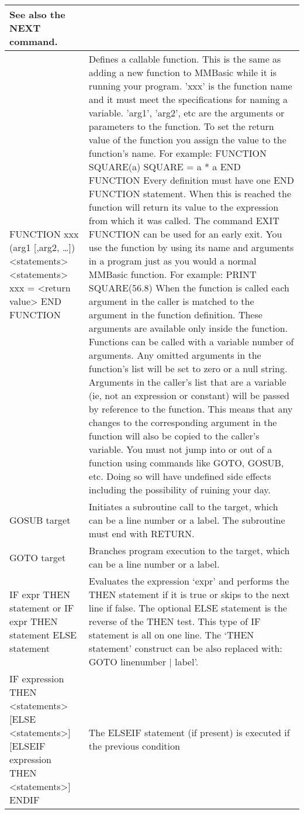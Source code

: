 \documentclass[11pt,fleqn]{book} %
\numberwithin{equation}{section} %
\numberwithin{figure}{section} %
\numberwithin{table}{section} %
\begin{document}
\begin{table}[]
\begin{tabular}{|p{4cm}|p{10cm}|}
See also the NEXT command.
\\ \hline
FUNCTION xxx (arg1
[,arg2, …])
<statements>
<statements>
xxx = <return value>
END FUNCTION
& Defines a callable function. This is the same as adding a new function to
MMBasic while it is running your program.
'xxx' is the function name and it must meet the specifications for naming
a variable. 'arg1', 'arg2', etc are the arguments or parameters to the
function.
To set the return value of the function you assign the value to the
function's name. For example:
FUNCTION SQUARE(a)
SQUARE = a * a
END FUNCTION
Every definition must have one END FUNCTION statement. When this
is reached the function will return its value to the expression from which
it was called. The command EXIT FUNCTION can be used for an early
exit.
You use the function by using its name and arguments in a program just
as you would a normal MMBasic function. For example:
PRINT SQUARE(56.8)
When the function is called each argument in the caller is matched to the
argument in the function definition. These arguments are available only
inside the function.
Functions can be called with a variable number of arguments. Any
omitted arguments in the function's list will be set to zero or a null string.
Arguments in the caller's list that are a variable (ie, not an expression or
constant) will be passed by reference to the function. This means that
any changes to the corresponding argument in the function will also be
copied to the caller's variable.
You must not jump into or out of a function using commands like
GOTO, GOSUB, etc. Doing so will have undefined side effects
including the possibility of ruining your day.
\\ \hline
GOSUB target & Initiates a subroutine call to the target, which can be a line number or a
label. The subroutine must end with RETURN.
\\ \hline
GOTO target & Branches program execution to the target, which can be a line number or
a label.
\\ \hline
IF expr THEN statement
or
IF expr THEN statement
ELSE statement
 & Evaluates the expression ‘expr' and performs the THEN statement if it is
true or skips to the next line if false. The optional ELSE statement is the
reverse of the THEN test. This type of IF statement is all on one line.
The ‘THEN statement’ construct can be also replaced with:
GOTO linenumber | label’.
\\ \hline
IF expression THEN
<statements>
[ELSE
<statements>]
[ELSEIF expression THEN
<statements>]
ENDIF
& The ELSEIF statement (if present) is executed if the previous condition

\end{tabular}
\end{table}
\end{document}
